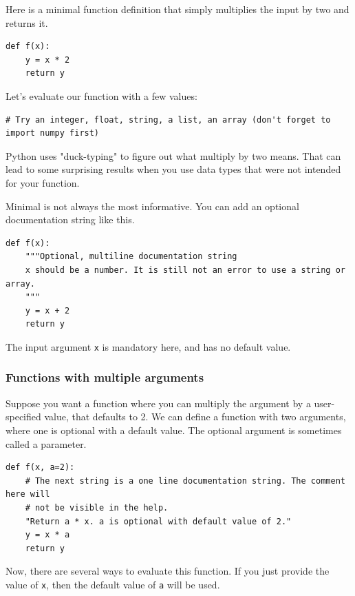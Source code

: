 \documentclass[11pt]{article}
\begin{document}
Here is a minimal function definition that simply multiplies the input by two and returns it.

\begin{verbatim}
def f(x):
    y = x * 2
    return y
\end{verbatim}

Let's evaluate our function with a few values:

\begin{verbatim}
# Try an integer, float, string, a list, an array (don't forget to import numpy first)
\end{verbatim}

Python uses "duck-typing" to figure out what multiply by two means. That can lead to some surprising results when you use data types that were not intended for your function.

Minimal is not always the most informative. You can add an optional documentation string like this.

\begin{verbatim}
def f(x):
    """Optional, multiline documentation string
    x should be a number. It is still not an error to use a string or array.
    """
    y = x + 2
    return y
\end{verbatim}

The input argument \texttt{x} is mandatory here, and has no default value.

\subsubsection{Functions with multiple arguments}
\label{sec:org45873d1}

Suppose you want a function where you can multiply the argument by a user-specified value, that defaults to 2. We can define a function with two arguments, where one is optional with a default value. The optional argument is sometimes called a parameter.

\begin{verbatim}
def f(x, a=2):
    # The next string is a one line documentation string. The comment here will
    # not be visible in the help.
    "Return a * x. a is optional with default value of 2."
    y = x * a
    return y
\end{verbatim}

Now, there are several ways to evaluate this function. If you just provide the value of \texttt{x}, then the default value of \texttt{a} will be used.
\end{document}
